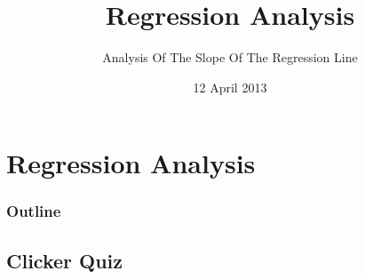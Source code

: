 
\section{Regression Analysis}

\title{Regression Analysis}
\subtitle{Analysis Of The Slope Of The Regression Line}

\date{12 April 2013}

\begin{frame}
  \titlepage
\end{frame}

\begin{frame}
  \frametitle{Outline}
  \tableofcontents[pausesection,hideothersubsections,sectionstyle=show/hide]
\end{frame}


\subsection{Clicker Quiz}


